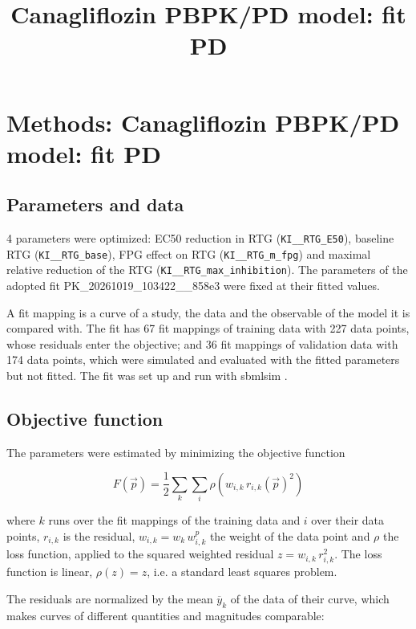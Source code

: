 \documentclass{article}
\title{Canagliflozin PBPK/PD model: fit PD}
\date{}
\begin{document}
\maketitle

\section{Methods: Canagliflozin PBPK/PD model: fit PD}

\subsection{Parameters and data}

4 parameters were optimized: EC50 reduction in RTG (\texttt{KI\_\_RTG\_E50}), baseline RTG (\texttt{KI\_\_RTG\_base}), FPG effect on RTG (\texttt{KI\_\_RTG\_m\_fpg}) and maximal relative reduction of the RTG (\texttt{KI\_\_RTG\_max\_inhibition}). The parameters of the adopted fit PK\_20261019\_103422\_\_858e3 were fixed at their fitted values.

A fit mapping is a curve of a study, the data and the observable of the model it is compared with. The fit has 67 fit mappings of training data with 227 data points, whose residuals enter the objective; and 36 fit mappings of validation data with 174 data points, which were simulated and evaluated with the fitted parameters but not fitted. The fit was set up and run with sbmlsim \cite{Koenig2026_sbmlsim}.

\subsection{Objective function}

The parameters were estimated by minimizing the objective function

\begin{equation}
F(\vec{p}) = \frac{1}{2} \sum_{k} \sum_{i} \rho\left(w_{i,k}\, r_{i,k}(\vec{p})^2\right)
\end{equation}

where $k$ runs over the fit mappings of the training data and $i$ over their data points, $r_{i,k}$ is the residual, $w_{i,k} = w_k\, w^{p}_{i,k}$ the weight of the data point and $\rho$ the loss function, applied to the squared weighted residual $z = w_{i,k}\, r_{i,k}^2$. The loss function is linear, $\rho(z) = z$, i.e. a standard least squares problem.

The residuals are normalized by the mean $\overline{y}_k$ of the data of their curve, which makes curves of different quantities and magnitudes comparable:
\end{document}
